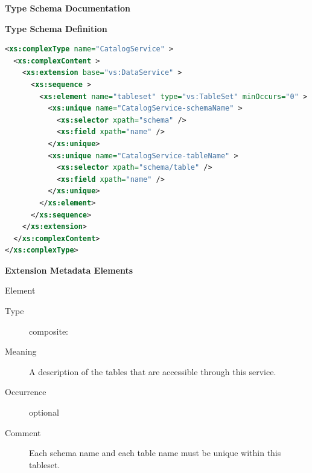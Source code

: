 \documentclass[11pt,a4paper]{ivoa}
\begin{document}
\begin{generated}
\begingroup
      	\renewcommand*\descriptionlabel[1]{%
      	\hbox to 5.5em{\emph{#1}\hfil}}\vspace{2ex}\noindent\textbf{ Type Schema Documentation}



\vspace{1ex}\noindent\textbf{ Type Schema Definition}

\begin{lstlisting}[language=XML,basicstyle=\footnotesize]
<xs:complexType name="CatalogService" >
  <xs:complexContent >
    <xs:extension base="vs:DataService" >
      <xs:sequence >
        <xs:element name="tableset" type="vs:TableSet" minOccurs="0" >
          <xs:unique name="CatalogService-schemaName" >
            <xs:selector xpath="schema" />
            <xs:field xpath="name" />
          </xs:unique>
          <xs:unique name="CatalogService-tableName" >
            <xs:selector xpath="schema/table" />
            <xs:field xpath="name" />
          </xs:unique>
        </xs:element>
      </xs:sequence>
    </xs:extension>
  </xs:complexContent>
</xs:complexType>
\end{lstlisting}

\vspace{0.5ex}\noindent\textbf{ Extension Metadata Elements}

\begingroup\small\begin{bigdescription}\item[Element \xmlel{tableset}]
\begin{description}
\item[Type] composite: 
\item[Meaning] 
                       A description of the tables that are accessible
                       through this service.
                     
\item[Occurrence] optional
\item[Comment] 
                       Each schema name and each table name must be
                       unique within this tableset.
                     

\end{description}


\end{bigdescription}\endgroup

\endgroup
\end{generated}
\end{document}
